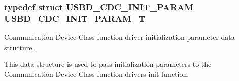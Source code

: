 \subsubsection[{\texorpdfstring{U\+S\+B\+D\+\_\+\+C\+D\+C\+\_\+\+I\+N\+I\+T\+\_\+\+P\+A\+R\+A\+M\+\_\+T}{USBD_CDC_INIT_PARAM_T}}]{\setlength{\rightskip}{0pt plus 5cm}typedef struct {\bf U\+S\+B\+D\+\_\+\+C\+D\+C\+\_\+\+I\+N\+I\+T\+\_\+\+P\+A\+R\+AM}  {\bf U\+S\+B\+D\+\_\+\+C\+D\+C\+\_\+\+I\+N\+I\+T\+\_\+\+P\+A\+R\+A\+M\+\_\+T}}\hypertarget{group__USBD__CDC_ga78b2c5f20653181161c59062795233b3}{}\label{group__USBD__CDC_ga78b2c5f20653181161c59062795233b3}


Communication Device Class function driver initialization parameter data structure. 

This data structure is used to pass initialization parameters to the Communication Device Class function driver\textquotesingle{}s init function. 